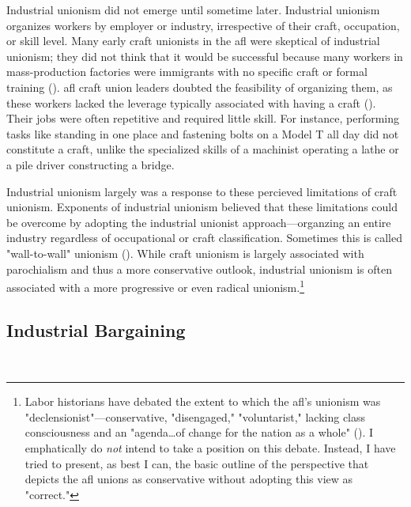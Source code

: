 \documentclass[12pt]{article}
\begin{document}

Industrial unionism did not emerge until sometime later. Industrial unionism organizes workers by employer or industry, irrespective of their craft, occupation, or skill level. Many early craft unionists in the \acrshort{afl} were skeptical of industrial unionism; they did not think that it would be successful because many workers in mass-production factories were immigrants with no specific craft or formal training (\cite{fonerHistoryLaborMovement1981a}). \acrshort{afl} craft union leaders doubted the feasibility of organizing them, as these workers lacked the leverage typically associated with having a craft (\cite{fonerHistoryLaborMovement1994}). Their jobs were often repetitive and required little skill. For instance, performing tasks like standing in one place and fastening bolts on a Model T all day did not constitute a craft, unlike the specialized skills of a machinist operating a lathe or a pile driver constructing a bridge.

Industrial unionism largely was a response to these percieved limitations of craft unionism. Exponents of industrial unionism believed that these limitations could be overcome by adopting the industrial unionist approach---organzing an entire industry regardless of occupational or craft classification. Sometimes this is called "wall-to-wall" unionism (\cite{meyersWhatAreMy2023}). While craft unionism is largely associated with parochialism and thus a more conservative outlook, industrial unionism is often associated with a more progressive or even radical unionism.\footnote{Labor historians have debated the extent to which the \acrshort{afl}'s unionism was "declensionist"---conservative, "disengaged," "voluntarist," lacking class consciousness and an "agenda\ldots of change for the nation as a whole" (\cite[61–62]{cobblePureSimpleRadicalism2013}). I emphatically do \emph{not} intend to take a position on this debate. Instead, I have tried to present, as best I can, the basic outline of the perspective that depicts the \acrshort{afl} unions as conservative without adopting this view as "correct."}

\subsection{Industrial Bargaining}\label{sub:ind_bargain}\
\end{document}
